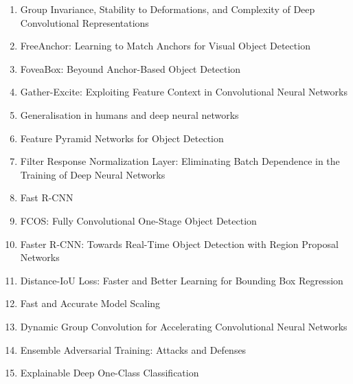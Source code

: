 \documentclass[acmlarge]{acmart}
\begin{document}
\begin{enumerate}
	\item Group Invariance, Stability to Deformations, and Complexity of Deep Convolutional Representations \cite{Bietti2019GroupIS} 

	\item FreeAnchor: Learning to Match Anchors for Visual Object Detection \cite{Zhang2019FreeAnchorLT} 

	\item FoveaBox: Beyound Anchor-Based Object Detection \cite{Kong2020FoveaBoxBA} 

	\item Gather-Excite: Exploiting Feature Context in Convolutional Neural Networks \cite{Hu2018GatherExciteEF} 

	\item Generalisation in humans and deep neural networks \cite{Geirhos2018GeneralisationIH} 

	\item Feature Pyramid Networks for Object Detection \cite{Lin2017FeaturePN} 

	\item Filter Response Normalization Layer: Eliminating Batch Dependence in the Training of Deep Neural Networks \cite{Singh2020FilterRN} 

	\item Fast R-CNN \cite{Girshick2015FastR} 

	\item FCOS: Fully Convolutional One-Stage Object Detection \cite{Tian2019FCOSFC} 

	\item Faster R-CNN: Towards Real-Time Object Detection with Region Proposal Networks \cite{Ren2015FasterRT} 

	\item Distance-IoU Loss: Faster and Better Learning for Bounding Box Regression \cite{Zheng2020DistanceIoULF} 

	\item Fast and Accurate Model Scaling \cite{Dollr2021FastAA} 

	\item Dynamic Group Convolution for Accelerating Convolutional Neural Networks \cite{Su2020DynamicGC} 

	\item Ensemble Adversarial Training: Attacks and Defenses \cite{Tramr2018EnsembleAT} 

	\item Explainable Deep One-Class Classification \cite{Liznerski2021ExplainableDO} 


\end{enumerate}
\end{document}

